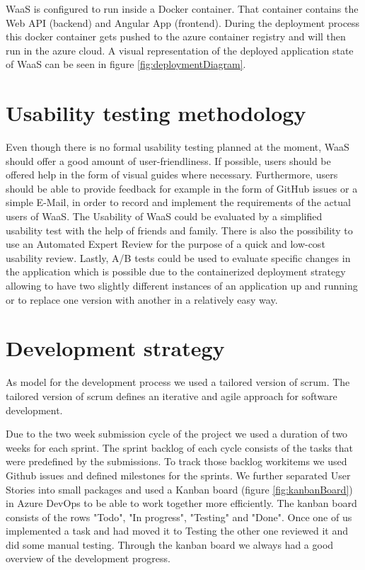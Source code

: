 \documentclass[titlepage, 12pt]{article}
\begin{document}
WaaS is configured to run inside a Docker container. That container contains the Web API (backend) and Angular App (frontend). During the deployment process this docker container gets pushed to the azure container registry and will then run in the azure cloud. A visual representation of the deployed application state of WaaS can be seen in figure \ref{fig:deploymentDiagram}.


\section {Usability testing methodology}
Even though there is no formal usability testing planned at the moment, WaaS should offer a good amount of user-friendliness.
If possible, users should be offered help in the form of visual guides where necessary.
Furthermore, users should be able to provide feedback for example in the form of GitHub issues or a simple E-Mail, in order to record and implement the requirements of the actual users of WaaS.
The Usability of WaaS could be evaluated by a simplified usability test with the help of friends and family.
There is also the possibility to use an Automated Expert Review for the purpose of a quick and low-cost usability review.
Lastly, A/B tests could be used to evaluate specific changes in the application which is possible due to the containerized deployment strategy allowing to have two slightly different
instances of an application up and running or to replace one version with another in a relatively easy way.

\section{Development strategy}

As model for the development process we used a tailored version of scrum. The tailored version of scrum defines an iterative and agile approach for software development.

Due to the two week submission cycle of the project we used a duration of two weeks for each sprint. The sprint backlog of each cycle consists of the tasks that were predefined by the submissions. To track those backlog workitems we used Github issues and defined milestones for the sprints. We further separated User Stories into small packages and used a Kanban board (figure \ref{fig:kanbanBoard}) in Azure DevOps to be able to work together more efficiently. The kanban board consists of the rows "Todo", "In progress", "Testing" and "Done". Once one of us implemented a task and had moved it to Testing the other one reviewed it and did some manual testing. Through the kanban board we always had a good overview of the development progress. 
\end{document}
